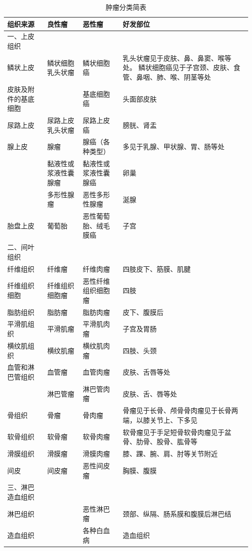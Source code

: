 \begin{longtable}[]{lp{3cm}p{3cm}p{3cm}}
    \caption{肿瘤分类简表}
    \label{tab5-1}\\
    \toprule
    组织来源 & 良性瘤 & 恶性瘤 & 好发部位
    \\
\midrule
一、上皮组织 & & &
\\\hline
\quad 鳞状上皮&
鳞状细胞乳头状瘤& 鳞状细胞癌&
乳头状瘤见于皮肤、鼻、鼻窦、喉等处。
鳞状细胞癌见于子宫颈、皮肤、食管、鼻咽、肺、喉、阴茎等处
\\\hline
\quad 皮肤及附件的基底细胞& &基底细胞癌&头面部皮肤
\\\hline
\quad 尿路上皮&尿路上皮乳头状瘤&尿路上皮癌&膀胱、肾盂
\\\hline
\quad 腺上皮&腺瘤&腺癌（各种类型）&多见于乳腺、甲状腺、胃、肠等处
\\\hline
&黏液性或浆液性囊腺瘤&黏液性或浆液性囊腺癌&卵巢
\\\hline
&多形性腺瘤&恶性多形性腺瘤&涎腺
\\\hline
\quad 胎盘上皮&葡萄胎&恶性葡萄胎、绒毛膜癌&子宫
\\\hline
二、间叶组织&&&
\\\hline
\quad 纤维组织&纤维瘤&纤维肉瘤&四肢皮下、筋膜、肌腱
\\\hline
\quad 纤维组织细胞&纤维组织细胞瘤&恶性纤维组织细胞瘤&四肢
\\\hline
\quad 脂肪组织&脂肪瘤&脂肪肉瘤&皮下、腹膜后
\\\hline
\quad 平滑肌组织&平滑肌瘤&平滑肌肉瘤&子宫及胃肠
\\\hline
\quad 横纹肌组织&横纹肌瘤&横纹肌肉瘤&四肢、头颈
\\\hline
\quad 血管和淋巴管组织&血管瘤&血管肉瘤&皮肤、舌唇等处
\\\hline
&淋巴管瘤&淋巴管肉瘤&皮肤、舌、唇等处
\\\hline
\quad 骨组织&骨瘤&骨肉瘤&骨瘤见于长骨、颅骨骨肉瘤见于长骨两端，以膝关节上、下多见
\\\hline
\quad 软骨组织&软骨瘤&软骨肉瘤&软骨瘤见于手足短骨软骨肉瘤见于盆骨、肋骨、股骨、肱骨等
\\\hline
\quad 滑膜组织&滑膜瘤&滑膜肉瘤&膝、踝、腕、肩、肘等关节附近
\\\hline
\quad 间皮&间皮瘤&恶性间皮瘤&胸膜、腹膜
\\\hline
三、淋巴造血组织&&&
\\\hline
\quad 淋巴组织&&恶性淋巴瘤&颈部、纵隔、肠系膜和腹膜后淋巴结
\\\hline
\quad 造血组织&&各种白血病&造血组织
\\\hline

\end{longtable}
